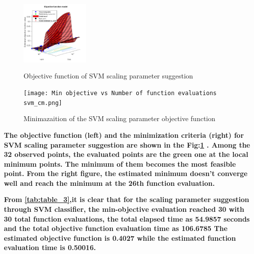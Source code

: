 \documentclass[5p]{elsarticle}
\begin{document}
\begin{frontmatter}
\begin{figure}[h!]
  \begin{minipage}
  \begin{center}
    \includegraphics[width=0.3\textwidth]{Objective function model_SVM_theta0.png}
  \end{center}
  \caption{Objective function of SVM scaling parameter suggestion}
  \end{minipage}
  \begin{minipage}
  \begin{center}
    \texttt{[image: Min objective vs Number of function evaluations svm\_cm.png]}
  \end{center}
  \caption{Minimazaition of the SVM scaling parameter objective function}
  \end{minipage}
  \label{fig_20}  
\end{figure}

\bf  The objective function (left) and the minimization criteria (right) for SVM scaling parameter suggestion are shown in the Fig:\ref{fig_20} . Among the 32 observed points, the evaluated points are the green one at the local minimum points. The minimum of them becomes the most feasible point. From the right figure, the estimated minimum doesn't converge well and reach the minimum at the 26th function evaluation.

\bf From \ref{tab:table_3},it is clear that for the scaling parameter suggestion through SVM classifier, the min-objective evaluation reached 30 with 30 total function evaluations, the total elapsed time as 54.9857 seconds and the total objective function evaluation time as 106.6785 The estimated objective function is 0.4027 while the estimated function evaluation time is 0.50016.


\end{frontmatter}
\end{document}
